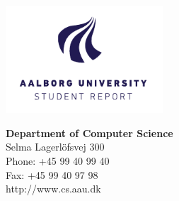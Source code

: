 {}
\thispagestyle{empty}

\begin{minipage}[t]{0.48\textwidth}
\vspace*{-25pt}			%
\includegraphics[height=4cm]{Images/AAU-logo-stud-UK-RGB}
\end{minipage}
\hfill
\begin{minipage}[t]{0.48\textwidth}
{\small \textbf{Department of Computer Science}\\
\small Selma Lagerlöfsvej 300 \\
\small Phone: +45 99 40 99 40 \\
\small Fax: +45 99 40 97 98 \\
\small http://www.cs.aau.dk}

\end{minipage}

\vspace*{1cm}

